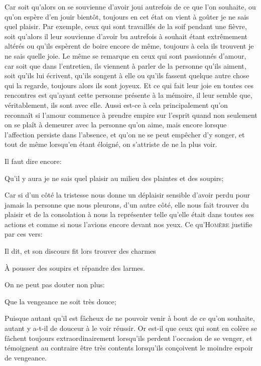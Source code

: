 Car soit qu'alors on se souvienne d'avoir joui autrefois de ce que l'on souhaite, ou qu'on espère d'en jouir
bientôt, toujours en cet état on vient à goûter je ne sais quel plaisir. Par exemple, ceux qui sont travaillés
de la soif pendant une fièvre, soit qu'alors il leur souvienne d'avoir bu autrefois à souhait étant extrêmement
altérés ou qu'ils espèrent de boire encore de même, toujours à cela ils trouvent je ne sais quelle joie. Le même
se remarque en ceux qui sont passionnés d'amour, car soit que dans l'entretien, ils viennent à parler de la
personne qu'ils aiment, soit qu'ils lui écrivent, qu'ils songent à elle ou qu'ils fassent quelque autre chose
qui la regarde, toujours alors ils sont joyeux. Et ce qui fait leur joie en toutes ces rencontres est qu'ayant
cette personne présente à la mémoire, il leur semble que, véritablement, ils sont avec elle. Aussi est-ce à cela
principalement qu'on reconnaît si l'amour commence à prendre empire sur l'esprit quand non seulement on se plaît
à demeurer avec la personne qu'on aime, mais encore lorsque l'affection persiste dans l'absence, et qu'on ne se
peut empêcher d'y songer, et tout de même lorsqu'en étant éloigné, on s’attriste de ne la plus voir.

\bigbreak

Il faut dire encore:

\begin{lieu}
	Qu'il y aura je ne sais quel plaisir au milieu des plaintes et des soupirs;
\end{lieu}

Car si d'un côté la tristesse nous donne un déplaisir sensible d'avoir perdu pour jamais la personne que nous
pleurons, d'un autre côté, elle nous fait trouver du plaisir et de la consolation à nous la représenter telle
qu'elle était dans toutes ses actions et comme si nous l'avions encore devant nos yeux. Ce qu'\textsc{Homère}
justifie par ces vers:

\begin{emphpar}
	Il dit, et son discours fit lors trouver des charmes

	À pousser des soupirs et répandre des larmes.
\end{emphpar}

\bigbreak

On ne peut pas douter non plus:

\begin{lieu}
	Que la vengeance ne soit très douce;
\end{lieu}

Puisque autant qu'il est fâcheux de ne pouvoir venir à bout de ce qu'on souhaite, autant y a-t-il de douceur à
le voir réussir. Or est-il que ceux qui sont en colère se fâchent toujours extraordinairement lorsqu'ils perdent
l'occasion de se venger, et témoignent au contraire être très contents lorsqu'ils conçoivent le moindre espoir
de vengeance. 

